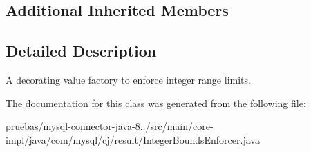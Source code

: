 \subsection*{Additional Inherited Members}


\subsection{Detailed Description}
A decorating value factory to enforce integer range limits. 

The documentation for this class was generated from the following file\+:\begin{DoxyCompactItemize}
\item 
pruebas/mysql-\/connector-\/java-\/8../src/main/core-\/impl/java/com/mysql/cj/result/Integer\+Bounds\+Enforcer.\+java\end{DoxyCompactItemize}
